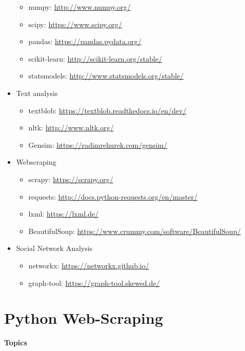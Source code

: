 \documentclass[
]{book}
\providecommand{\tightlist}{%
  \setlength{\itemsep}{0pt}\setlength{\parskip}{0pt}}
\begin{document}
\begin{itemize}
  \begin{itemize}
  \tightlist
  \item
    numpy: \url{http://www.numpy.org/}
  \item
    scipy: \url{https://www.scipy.org/}
  \item
    pandas: \url{https://pandas.pydata.org/}
  \item
    scikit-learn: \url{http://scikit-learn.org/stable/}
  \item
    statsmodels: \url{http://www.statsmodels.org/stable/}
  \end{itemize}
\item
  Text analysis

  \begin{itemize}
  \tightlist
  \item
    textblob: \url{https://textblob.readthedocs.io/en/dev/}
  \item
    nltk: \url{http://www.nltk.org/}
  \item
    Gensim: \url{https://radimrehurek.com/gensim/}
  \end{itemize}
\item
  Webscraping

  \begin{itemize}
  \tightlist
  \item
    scrapy: \url{https://scrapy.org/}
  \item
    requests: \url{http://docs.python-requests.org/en/master/}
  \item
    lxml: \url{https://lxml.de/}
  \item
    BeautifulSoup: \url{https://www.crummy.com/software/BeautifulSoup/}
  \end{itemize}
\item
  Social Network Analysis

  \begin{itemize}
  \tightlist
  \item
    networkx: \url{https://networkx.github.io/}
  \item
    graph-tool: \url{https://graph-tool.skewed.de/}
  \end{itemize}
\end{itemize}

\hypertarget{python-web-scraping}{%
\chapter{Python Web-Scraping}\label{python-web-scraping}}

\textbf{Topics}
\end{document}
